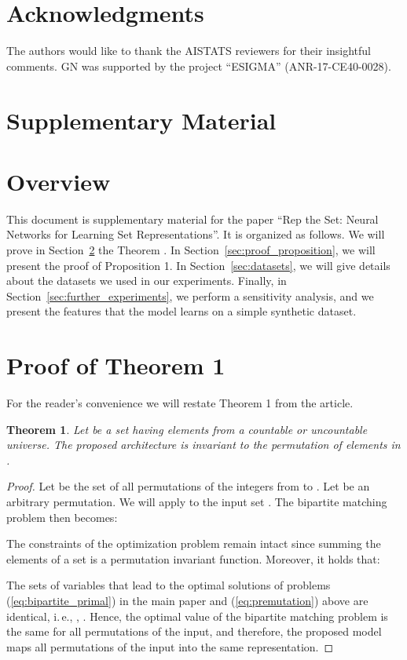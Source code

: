 \documentclass[twoside]{article}
\newcommand{\ie}{i.\,e., }
\newtheorem{theorem}{Theorem}
\begin{document}
\section*{Acknowledgments}
The authors would like to thank the AISTATS reviewers for their insightful comments.
GN was supported by the project ``ESIGMA'' (ANR-17-CE40-0028).



\clearpage
\appendix

\section*{Supplementary Material}

\section{Overview}
This document is supplementary material for the paper ``Rep the Set: Neural Networks for Learning Set Representations''.
It is organized as follows.
We will prove in Section~\ref{sec:proof_theorem} the Theorem .
In Section~\ref{sec:proof_proposition}, we will present the proof of Proposition 1.
In Section~\ref{sec:datasets}, we will give details about the datasets we used in our experiments.
Finally, in Section~\ref{sec:further_experiments}, we perform a sensitivity analysis, and we present the features that the model learns on a simple synthetic dataset.

\section{Proof of Theorem 1}\label{sec:proof_theorem}
For the reader's convenience we will restate Theorem 1 from the article.
\begin{theorem}
    Let  be a set having elements from a countable or uncountable universe.
    The proposed architecture is invariant to the permutation of elements in .
\end{theorem}
\begin{proof}
Let  be the set of all permutations of the integers from  to .
Let  be an arbitrary permutation.
We will apply  to the input set .
The bipartite matching problem then becomes:

The constraints of the optimization problem remain intact since summing the elements of a set is a permutation invariant function.
Moreover, it holds that: 

The sets of variables that lead to the optimal solutions of problems (\ref{eq:bipartite_primal}) in the main paper and (\ref{eq:premutation}) above are identical, \ie , .
Hence, the optimal value of the bipartite matching problem is the same for all  permutations of the input, and therefore, the proposed model maps all permutations of the input into the same representation.
\end{proof}
\end{document}
